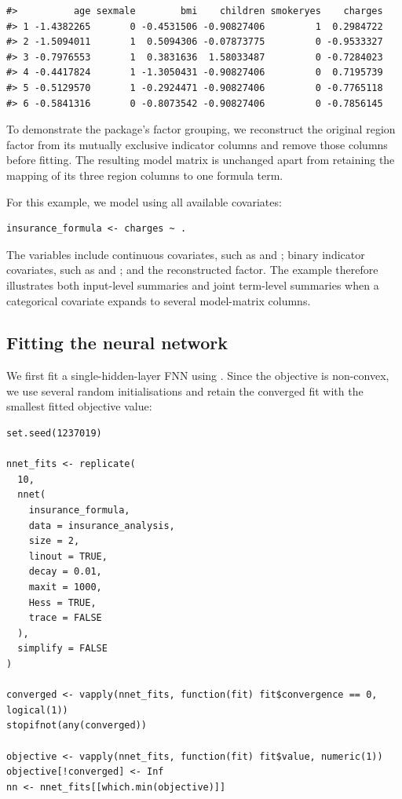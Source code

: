 \begin{verbatim}
#>          age sexmale        bmi    children smokeryes    charges
#> 1 -1.4382265       0 -0.4531506 -0.90827406         1  0.2984722
#> 2 -1.5094011       1  0.5094306 -0.07873775         0 -0.9533327
#> 3 -0.7976553       1  0.3831636  1.58033487         0 -0.7284023
#> 4 -0.4417824       1 -1.3050431 -0.90827406         0  0.7195739
#> 5 -0.5129570       1 -0.2924471 -0.90827406         0 -0.7765118
#> 6 -0.5841316       0 -0.8073542 -0.90827406         0 -0.7856145
\end{verbatim}

To demonstrate the package's factor grouping, we reconstruct the original region factor from its mutually exclusive indicator columns and remove those columns before fitting.
The resulting model matrix is unchanged apart from retaining the mapping of its three region columns to one formula term.

For this example, we model  using all available covariates:

\begin{verbatim}
insurance_formula <- charges ~ .
\end{verbatim}

The variables include continuous covariates, such as  and ; binary indicator covariates, such as  and ; and the reconstructed  factor.
The example therefore illustrates both input-level summaries and joint term-level summaries when a categorical covariate expands to several model-matrix columns.

\subsection{Fitting the neural network}\label{fitting-the-neural-network}

We first fit a single-hidden-layer FNN using .
Since the objective is non-convex, we use several random initialisations and retain the converged fit with the smallest fitted objective value:

\begin{verbatim}
set.seed(1237019)

nnet_fits <- replicate(
  10,
  nnet(
    insurance_formula,
    data = insurance_analysis,
    size = 2,
    linout = TRUE,
    decay = 0.01,
    maxit = 1000,
    Hess = TRUE,
    trace = FALSE
  ),
  simplify = FALSE
)

converged <- vapply(nnet_fits, function(fit) fit$convergence == 0, logical(1))
stopifnot(any(converged))

objective <- vapply(nnet_fits, function(fit) fit$value, numeric(1))
objective[!converged] <- Inf
nn <- nnet_fits[[which.min(objective)]]
\end{verbatim}

